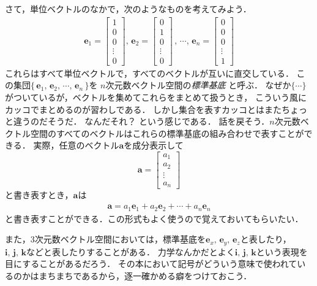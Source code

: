 さて，単位ベクトルのなかで，次のようなものを考えてみよう．
\begin{align}
\bm{e}_1 = \left[ 
 \begin{array}{c}
  1 \\
  0 \\
  0 \\
  \vdots \\
  0
 \end{array}
 \right]
  , \, 
 \bm{e}_2 = \left[ 
 \begin{array}{c}
  0 \\
  1 \\
  0 \\
  \vdots \\
  0
 \end{array}
 \right]
 \, , \, 
 \cdots 
 , \, 
 \bm{e}_n = \left[ 
 \begin{array}{c}
  0 \\
  0 \\
  0 \\
  \vdots \\
  1
 \end{array}
 \right]
 \label{eq:hyoujunnkitei}
\end{align}
これらはすべて単位ベクトルで，すべてのベクトルが互いに直交している．
この集団$\{ \, \bm{e}_1, \, \bm{e}_2, \, \cdots , \, \bm{e}_n \, \}$を
$n$次元数ベクトル空間の\emph{標準基底}
と呼ぶ．
なぜか$ \{ \cdots \} $がついているが，ベクトルを集めてこれらをまとめて扱うとき，
こういう風にカッコでまとめるのが習わしである．
しかし集合を表すカッコとはまたちょっと違うのだそうだ．
なんだそれ？ という感じである．
話を戻そう．$n$次元数ベクトル空間のすべてのベクトルはこれらの標準基底の組み合わせで表すことができる．
実際，任意のベクトル$\bm{a}$を成分表示して
$$
\bm{a} = \left[
 \begin{array}{c}
  a_1 \\
  a_2 \\
  \vdots \\
  a_n
 \end{array}
 \right]
$$
と書き表すとき，$\bm{a}$は
\begin{align}
\bm{a} = a_1 \bm{e}_1 + a_2 \bm{e}_2 + \cdots + a_n \bm{e}_n
\label{eq:veckiteihyougenn}
\end{align}
と書き表すことができる．この形式もよく使うので覚えておいてもらいたい．

また，3次元数ベクトル空間においては，標準基底を$\bm{e}_x, \, \bm{e}_y, \, \bm{e}_z$と表したり，
$\bm{i} , \, \bm{j}, \, \bm{k}$などと表したりすることがある．
力学なんかだとよく$\bm{i}, \, \bm{j}, \, \bm{k}$という表現を目にすることがあるだろう．
その本において記号がどういう意味で使われているのかはまちまちであるから，逐一確かめる癖をつけておこう．

